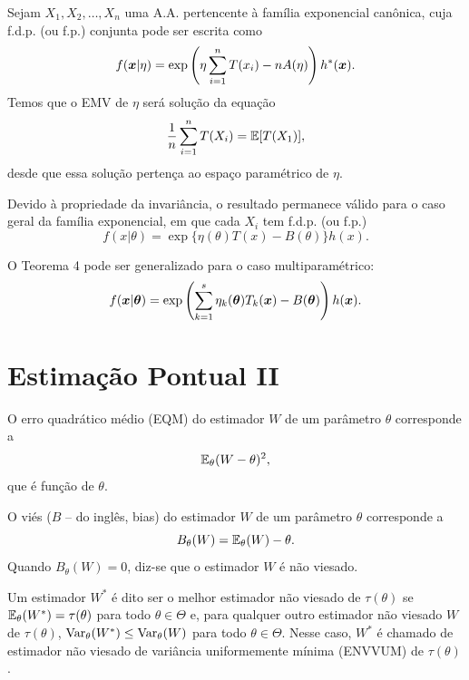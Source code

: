\begin{theorem}
	Sejam $X_1, X_2, \ldots, X_n$ uma A.A. pertencente à família exponencial canônica, cuja f.d.p. (ou f.p.) conjunta pode ser escrita como
	\[
	f(\bm{x} | \eta) = \exp\left(\eta \sum_{i=1}^{n} T(x_i) - nA(\eta)\right) h^*(\bm{x}).
	\]
	Temos que o EMV de $\eta$ será solução da equação
	\[
	\frac{1}{n} \sum_{i=1}^{n} T(X_i) = \operatorname{\mathbb{E}}[T(X_1)],
	\]
	desde que essa solução pertença ao espaço paramétrico de $\eta$.
	
	\begin{note}
		Devido à propriedade da invariância, o resultado permanece válido para o caso geral da família exponencial, em que cada $X_i$ tem f.d.p. (ou f.p.)
		\[
		f(x | \theta) = \exp\{\eta(\theta)T(x) - B(\theta)\} h(x).
		\]
	\end{note}
	
	\begin{note}
		O Teorema 4 pode ser generalizado para o caso multiparamétrico:
		\[
		f(\bm{x} | \bm{\theta}) = \exp\left(\sum_{k=1}^{s} \eta_k(\bm{\theta})T_k(\bm{x}) - B(\bm{\theta})\right) h(\bm{x}).
		\]
	\end{note}
\end{theorem}

\section{Estimação Pontual II}

\begin{definition}
	O erro quadrático médio (EQM) do estimador $W$ de um parâmetro $\theta$ corresponde a
	\[
	\operatorname{\mathbb{E}}_\theta(W - \theta)^2,
	\]
	que é função de $\theta$.
\end{definition}

\begin{definition}[Viés]
	O viés ($B$ -- do inglês, bias) do estimador $W$ de um parâmetro $\theta$ corresponde a
	\[
	B_\theta(W) = \operatorname{\mathbb{E}}_\theta(W) - \theta.
	\]
	Quando $B_\theta(W) = 0$, diz-se que o estimador $W$ é não viesado.
\end{definition}

\begin{definition}[ENVVUM]
	Um estimador $W^*$ é dito ser o melhor estimador não viesado de $\tau(\theta)$ se $\operatorname{\mathbb{E}}_\theta(W^*) = \tau(\theta)$ para todo $\theta \in \Theta$ e, para qualquer outro estimador não viesado $W$ de $\tau(\theta)$, $\operatorname{Var}_\theta(W^*) \leq \operatorname{Var}_\theta(W)$ para todo $\theta \in \Theta$. Nesse caso, $W^*$ é chamado de estimador não viesado de variância uniformemente mínima (ENVVUM) de $\tau(\theta)$.
\end{definition}

